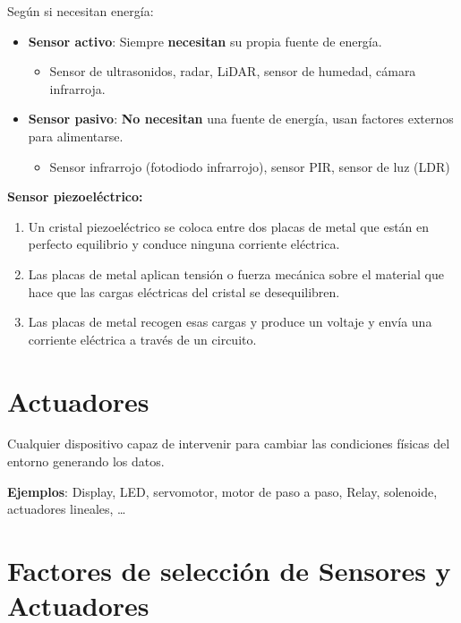 \documentclass[12pt]{report} %
\begin{document}
Según si necesitan energía:

\begin{itemize}

\item
  \textbf{Sensor activo}: Siempre \textbf{necesitan} su propia fuente de
  energía.

  \begin{itemize}
  
  \item
    Sensor de ultrasonidos, radar, LiDAR, sensor de humedad, cámara
    infrarroja.
  \end{itemize}
\item
  \textbf{Sensor pasivo}: \textbf{No necesitan} una fuente de energía,
  usan factores externos para alimentarse.

  \begin{itemize}
  
  \item
    Sensor infrarrojo (fotodiodo infrarrojo), sensor PIR, sensor de luz
    (LDR)
  \end{itemize}
\end{itemize}

\textbf{Sensor piezoeléctrico:}

\begin{enumerate}
\def\labelenumi{\arabic{enumi}.}

\item
  Un cristal piezoeléctrico se coloca entre dos placas de metal que
  están en perfecto equilibrio y conduce ninguna corriente eléctrica.
\item
  Las placas de metal aplican tensión o fuerza mecánica sobre el
  material que hace que las cargas eléctricas del cristal se
  desequilibren.
\item
  Las placas de metal recogen esas cargas y produce un voltaje y envía
  una corriente eléctrica a través de un circuito.
\end{enumerate}

\section{Actuadores}

Cualquier dispositivo capaz de intervenir para cambiar las condiciones
físicas del entorno generando los datos.

\textbf{Ejemplos}: Display, LED, servomotor, motor de paso a paso,
Relay, solenoide, actuadores lineales, \ldots{}

\section{Factores de selección de Sensores y
Actuadores}
\end{document}
